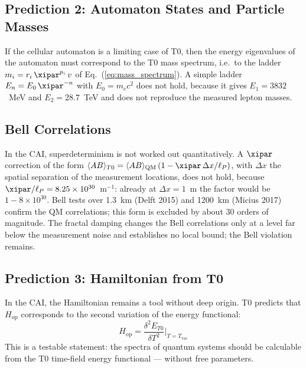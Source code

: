 \subsection{Prediction 2: Automaton States and Particle Masses}

If the cellular automaton is a limiting case of T0, then the energy eigenvalues
of the automaton must correspond to the T0 mass spectrum, i.e.\ to the ladder
$m_i = r_i\,\xipar^{p_i}\,v$ of Eq.~(\ref{eq:mass_spectrum}). A simple ladder
$E_n = E_0\,\xipar^{-n}$ with $E_0 = m_ec^2$ does not hold, because it gives
$E_1 = 3832$~MeV and $E_2 = 28.7$~TeV and does not reproduce the measured lepton
masses.

\subsection{Bell Correlations}

In the CAI, superdeterminism is not worked out quantitatively. A $\xipar$
correction of the form
$\langle AB \rangle_{T0} = \langle AB \rangle_{\text{QM}}\,(1 - \xipar\,\Delta x/\ell_P)$,
with $\Delta x$ the spatial separation of the measurement locations, does not hold,
because $\xipar/\ell_P = 8.25\times10^{30}$~m$^{-1}$: already at $\Delta x = 1$~m the
factor would be $1 - 8\times10^{30}$. Bell tests over 1.3~km (Delft 2015) and
1200~km (Micius 2017) confirm the QM correlations; this form is excluded by about
30 orders of magnitude. The fractal damping changes the Bell correlations only at a
level far below the measurement noise and establishes no local bound; the Bell
violation remains.

\subsection{Prediction 3: Hamiltonian from T0}

In the CAI, the Hamiltonian remains a tool without deep origin. T0 predicts
that $H_{\text{op}}$ corresponds to the second variation of the energy
functional:
\begin{equation}
    H_{\text{op}} = \frac{\delta^2 E_{T0}}{\delta T^2}
    \bigg|_{T = T_{\text{vac}}}
    \label{eq:hamilton_from_t0}
\end{equation}
This is a testable statement: the spectra of quantum systems should be calculable
from the T0 time-field energy functional — without free parameters.

\clearpage


